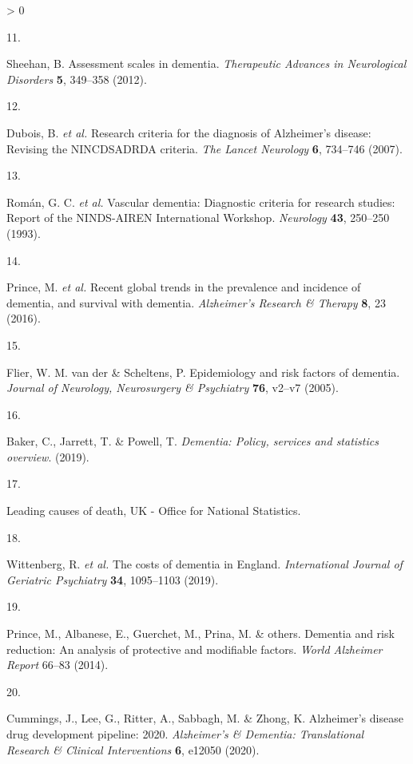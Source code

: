 \documentclass[a4paper, twoside]{templates/ociamthesis}
\newlength{\cslhangindent}
\newlength{\csllabelwidth}
\newenvironment{CSLReferences}[3] %
 {%
  \setlength{\parindent}{0pt}
  \ifodd #1 \everypar{\setlength{\hangindent}{\cslhangindent}}\ignorespaces\fi
  \ifnum #2 > 0
  \setlength{\parskip}{#2\baselineskip}
  \fi
 }%
 {}
\newcommand{\CSLLeftMargin}[1]{\parbox[t]{\maxof{\widthof{#1}}{\csllabelwidth}}{#1}}
\newcommand{\CSLRightInline}[1]{\parbox[t]{\linewidth - \csllabelwidth}{#1}}
\begin{document}
\begin{CSLReferences}{0}{0}
\leavevmode\hypertarget{ref-sheehan2012}{}%
\CSLLeftMargin{11. }
\CSLRightInline{Sheehan, B. Assessment scales in dementia. \emph{Therapeutic Advances in Neurological Disorders} \textbf{5}, 349--358 (2012).}

\leavevmode\hypertarget{ref-dubois2007}{}%
\CSLLeftMargin{12. }
\CSLRightInline{Dubois, B. \emph{et al.} Research criteria for the diagnosis of {Alzheimer}'s disease: Revising the {NINCDS}{{ADRDA}} criteria. \emph{The Lancet Neurology} \textbf{6}, 734--746 (2007).}

\leavevmode\hypertarget{ref-roman1993}{}%
\CSLLeftMargin{13. }
\CSLRightInline{Román, G. C. \emph{et al.} Vascular dementia: Diagnostic criteria for research studies: Report of the {NINDS}-{AIREN International Workshop}. \emph{Neurology} \textbf{43}, 250--250 (1993).}

\leavevmode\hypertarget{ref-prince2016}{}%
\CSLLeftMargin{14. }
\CSLRightInline{Prince, M. \emph{et al.} Recent global trends in the prevalence and incidence of dementia, and survival with dementia. \emph{Alzheimer's Research \& Therapy} \textbf{8}, 23 (2016).}

\leavevmode\hypertarget{ref-flier2005}{}%
\CSLLeftMargin{15. }
\CSLRightInline{Flier, W. M. van der \& Scheltens, P. Epidemiology and risk factors of dementia. \emph{Journal of Neurology, Neurosurgery \& Psychiatry} \textbf{76}, v2--v7 (2005).}

\leavevmode\hypertarget{ref-baker2019}{}%
\CSLLeftMargin{16. }
\CSLRightInline{Baker, C., Jarrett, T. \& Powell, T. \emph{Dementia: Policy, services and statistics overview}. (2019).}

\leavevmode\hypertarget{ref-zotero-15757}{}%
\CSLLeftMargin{17. }
\CSLRightInline{Leading causes of death, {UK} - {Office} for {National Statistics}.}

\leavevmode\hypertarget{ref-wittenberg2019}{}%
\CSLLeftMargin{18. }
\CSLRightInline{Wittenberg, R. \emph{et al.} The costs of dementia in {England}. \emph{International Journal of Geriatric Psychiatry} \textbf{34}, 1095--1103 (2019).}

\leavevmode\hypertarget{ref-prince2014}{}%
\CSLLeftMargin{19. }
\CSLRightInline{Prince, M., Albanese, E., Guerchet, M., Prina, M. \& others. Dementia and risk reduction: An analysis of protective and modifiable factors. \emph{World Alzheimer Report} 66--83 (2014).}

\leavevmode\hypertarget{ref-cummings2020}{}%
\CSLLeftMargin{20. }
\CSLRightInline{Cummings, J., Lee, G., Ritter, A., Sabbagh, M. \& Zhong, K. Alzheimer's disease drug development pipeline: 2020. \emph{Alzheimer's \& Dementia: Translational Research \& Clinical Interventions} \textbf{6}, e12050 (2020).}


\end{CSLReferences}
\end{document}

